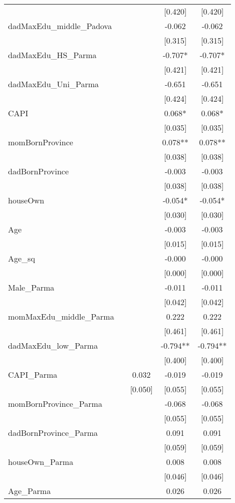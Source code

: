 \documentclass[]{article}
\begin{document}
\begin{tabular}{lcccc}
 &  &  & [0.420] & [0.420] \\
dadMaxEdu\_middle\_Padova &  &  & -0.062 & -0.062 \\
 &  &  & [0.315] & [0.315] \\
dadMaxEdu\_HS\_Parma &  &  & -0.707* & -0.707* \\
 &  &  & [0.421] & [0.421] \\
dadMaxEdu\_Uni\_Parma &  &  & -0.651 & -0.651 \\
 &  &  & [0.424] & [0.424] \\
CAPI &  &  & 0.068* & 0.068* \\
 &  &  & [0.035] & [0.035] \\
momBornProvince &  &  & 0.078** & 0.078** \\
 &  &  & [0.038] & [0.038] \\
dadBornProvince &  &  & -0.003 & -0.003 \\
 &  &  & [0.038] & [0.038] \\
houseOwn &  &  & -0.054* & -0.054* \\
 &  &  & [0.030] & [0.030] \\
Age &  &  & -0.003 & -0.003 \\
 &  &  & [0.015] & [0.015] \\
Age\_sq &  &  & -0.000 & -0.000 \\
 &  &  & [0.000] & [0.000] \\
Male\_Parma &  &  & -0.011 & -0.011 \\
 &  &  & [0.042] & [0.042] \\
momMaxEdu\_middle\_Parma &  &  & 0.222 & 0.222 \\
 &  &  & [0.461] & [0.461] \\
dadMaxEdu\_low\_Parma &  &  & -0.794** & -0.794** \\
 &  &  & [0.400] & [0.400] \\
CAPI\_Parma &  & 0.032 & -0.019 & -0.019 \\
 &  & [0.050] & [0.055] & [0.055] \\
momBornProvince\_Parma &  &  & -0.068 & -0.068 \\
 &  &  & [0.055] & [0.055] \\
dadBornProvince\_Parma &  &  & 0.091 & 0.091 \\
 &  &  & [0.059] & [0.059] \\
houseOwn\_Parma &  &  & 0.008 & 0.008 \\
 &  &  & [0.046] & [0.046] \\
Age\_Parma &  &  & 0.026 & 0.026 \\

\end{tabular}
\end{document}
